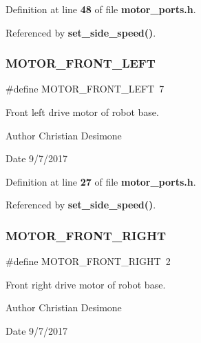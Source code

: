 Definition at line \textbf{ 48} of file \textbf{ motor\+\_\+ports.\+h}.



Referenced by \textbf{ set\+\_\+side\+\_\+speed()}.

\mbox{\label{motor__ports_8h_a743b47e164fb23b30f4f2f228db0b338}} 
\subsubsection{M\+O\+T\+O\+R\+\_\+\+F\+R\+O\+N\+T\+\_\+\+L\+E\+FT}
{\footnotesize\ttfamily \#define M\+O\+T\+O\+R\+\_\+\+F\+R\+O\+N\+T\+\_\+\+L\+E\+FT~7}



Front left drive motor of robot base. 

\begin{DoxyAuthor}{Author}
Christian Desimone 
\end{DoxyAuthor}
\begin{DoxyDate}{Date}
9/7/2017 
\end{DoxyDate}


Definition at line \textbf{ 27} of file \textbf{ motor\+\_\+ports.\+h}.



Referenced by \textbf{ set\+\_\+side\+\_\+speed()}.

\mbox{\label{motor__ports_8h_a6f48bcc6d5fce24caeae0b17954c277a}} 
\subsubsection{M\+O\+T\+O\+R\+\_\+\+F\+R\+O\+N\+T\+\_\+\+R\+I\+G\+HT}
{\footnotesize\ttfamily \#define M\+O\+T\+O\+R\+\_\+\+F\+R\+O\+N\+T\+\_\+\+R\+I\+G\+HT~2}



Front right drive motor of robot base. 

\begin{DoxyAuthor}{Author}
Christian Desimone 
\end{DoxyAuthor}
\begin{DoxyDate}{Date}
9/7/2017 
\end{DoxyDate}



